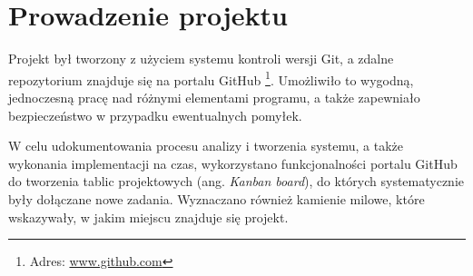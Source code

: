 \section{Prowadzenie projektu}
Projekt był tworzony z użyciem systemu kontroli wersji Git, a zdalne repozytorium znajduje się na portalu GitHub \footnote{Adres: \url{www.github.com}}. Umożliwiło to wygodną, jednoczesną pracę nad różnymi elementami programu, a także zapewniało bezpieczeństwo w przypadku ewentualnych pomyłek.

W celu udokumentowania procesu analizy i tworzenia systemu, a także wykonania implementacji na czas, wykorzystano funkcjonalności portalu GitHub do tworzenia tablic projektowych (ang. \textit{Kanban board}), do których systematycznie były dołączane nowe zadania. Wyznaczano również kamienie milowe, które wskazywały, w jakim miejscu znajduje się projekt. 